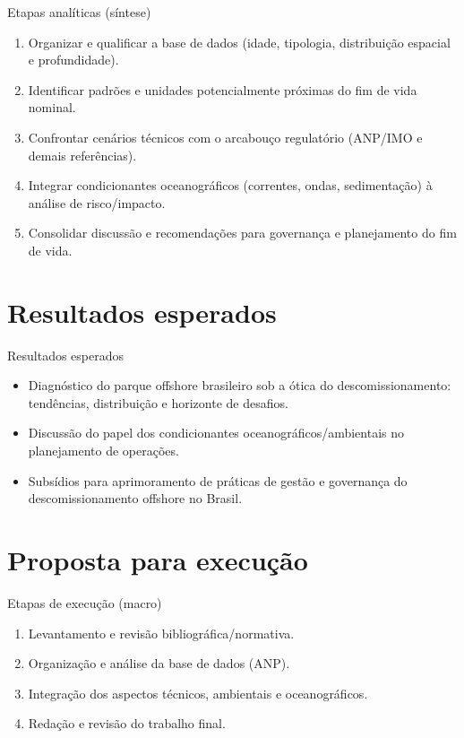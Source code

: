 \documentclass[aspectratio=169,11pt]{beamer}
\begin{document}
\begin{frame}{Etapas analíticas (síntese)}
\begin{enumerate}
  \item Organizar e qualificar a base de dados (idade, tipologia, distribuição espacial e profundidade).
  \item Identificar padrões e unidades potencialmente próximas do fim de vida nominal.
  \item Confrontar cenários técnicos com o arcabouço regulatório (ANP/IMO e demais referências).
  \item Integrar condicionantes oceanográficos (correntes, ondas, sedimentação) à análise de risco/impacto.
  \item Consolidar discussão e recomendações para governança e planejamento do fim de vida.
\end{enumerate}
\end{frame}

\section{Resultados esperados}

\begin{frame}{Resultados esperados}
\begin{itemize}
  \item Diagnóstico do parque offshore brasileiro sob a ótica do descomissionamento: tendências, distribuição e horizonte de desafios.
  \item Discussão do papel dos condicionantes oceanográficos/ambientais no planejamento de operações.
  \item Subsídios para aprimoramento de práticas de gestão e governança do descomissionamento offshore no Brasil.
\end{itemize}
\end{frame}

\section{Proposta para execução}

\begin{frame}{Etapas de execução (macro)}
\begin{enumerate}
  \item Levantamento e revisão bibliográfica/normativa.
  \item Organização e análise da base de dados (ANP).
  \item Integração dos aspectos técnicos, ambientais e oceanográficos.
  \item Redação e revisão do trabalho final.
\end{enumerate}
\end{frame}
\end{document}
